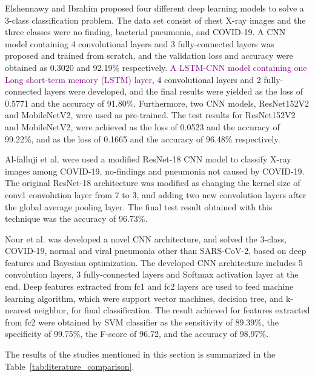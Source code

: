 Elshennawy and Ibrahim \cite{literature_elshennawy} proposed four different deep learning models to solve a 3-class classification problem. The data set consist of chest X-ray images and the three classes were no finding, bacterial pneumonia, and COVID-19. A CNN model containing 4 convolutional layers and 3 fully-connected layers was proposed and trained from scratch, and the validation loss and accuracy were obtained as 0.3020 and 92.19\% respectively. \textcolor{purple}{A LSTM-CNN model containing one Long short-term memory (LSTM) layer}, 4 convolutional layers and 2 fully-connected layers were developed, and the final results were yielded as the loss of 0.5771 and the accuracy of 91.80\%. Furthermore, two CNN models, ResNet152V2 and MobileNetV2, were used as pre-trained. The test results for ResNet152V2 and MobileNetV2, were achieved as the loss of 0.0523 and the accuracy of 99.22\%, and as the loss of 0.1665 and the accuracy of 96.48\% respectively.

Al-falluji et al. \cite{literature_Al-Falluji} were used a modified ResNet-18 CNN model to classify X-ray images among COVID-19, no-findings and pneumonia not caused by COVID-19. The original ResNet-18 architecture was modified as changing the kernel size of conv1 convolution layer from 7 to 3, and adding two new convolution layers after the global average pooling layer. The final test result obtained with this technique was the accuracy of 96.73\%.

Nour et al. \cite{A_novelCNNModel} was developed a novel CNN architecture, and solved the 3-class, COVID-19, normal and viral pneumonia other than SARS-CoV-2, based on deep features and Bayesian optimization. The developed CNN architecture includes 5 convolution layers, 3 fully-connected layers and Softmax activation layer at the end. Deep features extracted from fc1 and fc2 layers are used to feed machine learning algorithm, which were support vector machines, decision tree, and k-nearest neighbor, for final classification. The result achieved for features extracted from fc2 were obtained by SVM classifier as the sensitivity of 89.39\%, the specificity of 99.75\%, the F-score of 96.72, and the accuracy of 98.97\%.

The results of the studies mentioned in this section is summarized in the Table~\ref{tab:literature_comparison}.

